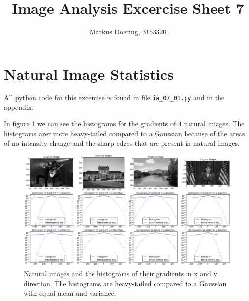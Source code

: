 \documentclass[11pt,a4paper]{scrartcl}
\begin{document}
\lstset{
    style=customc
} 

\title{Image Analysis Excercise Sheet 7}
\author{Markus Doering, 3153320}
\maketitle

\section{Natural Image Statistics}
All python code for this excercise is found in file \verb$ia_07_01.py$ and in the appendix. 

In figure \ref{fig:1} we can see the histograms for the gradients of 4 natural images. The histograms arer more heavy-tailed compared to a Gaussian because of the areas of no intensity change and the sharp edges 
that are present in natural images. 

\begin{figure}[hb]\label{fig:1}
\includegraphics[width=.99\linewidth]{histograms_cut.png}
\caption{Natural images and the histograms of their gradients in x and y direction. The histograms are heavy-tailed compared to a Gaussian with equal mean and variance.}
\end{figure}

\end{document}
